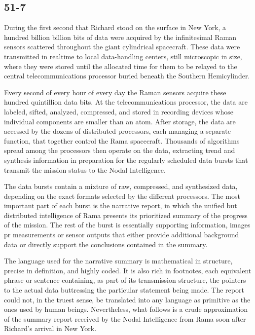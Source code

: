 \documentclass[]{article}
\begin{document}
{{\subsection*{51-7}

During the first second that Richard stood on the surface in New York, a hundred billion billion bits of data were acquired by the infinitesimal Raman sensors scattered throughout the giant cylindrical spacecraft.  These data were transmitted in realtime to local data-handling centers, still microscopic in size, where they were stored until the allocated time for them to be relayed to the central telecommunications processor buried beneath the Southern Hemicylinder.

Every second of every hour of every day the Raman sensors acquire these hundred quintillion data bits.  At the telecommunications processor, the data are labeled, sifted, analyzed, compressed, and stored in recording devices whose individual components are smaller than an atom.  After storage, the data are accessed by the dozens of distributed processors, each managing a separate function, that together control the Rama spacecraft.  Thousands of algorithms spread among the processors then operate on the data, extracting trend and synthesis information in preparation for the regularly scheduled data bursts that transmit the mission status to the Nodal Intelligence.

The data bursts contain a mixture of raw, compressed, and synthesized data, depending on the exact formats selected by the different processors.  The most important part of each burst is the narrative report, in which the unified but distributed intelligence of Rama presents its prioritized summary of the progress of the mission.  The rest of the burst is essentially supporting information, images pr measurements or sensor outputs that either provide additional background data or directly support the conclusions contained in the summary.

The language used for the narrative summary is mathematical in structure, precise in definition, and highly coded.  It is also rich in footnotes, each equivalent phrase or sentence containing, as part of its transmission structure, the pointers to the actual data buttressing the particular statement being made.  The report could not, in the truest sense, be translated into any language as primitive as the ones used by human beings.  Nevertheless, what follows is a crude approximation of the summary report received by the Nodal Intelligence from Rama soon after Richard’s arrival in New York.

}}
\end{document}
